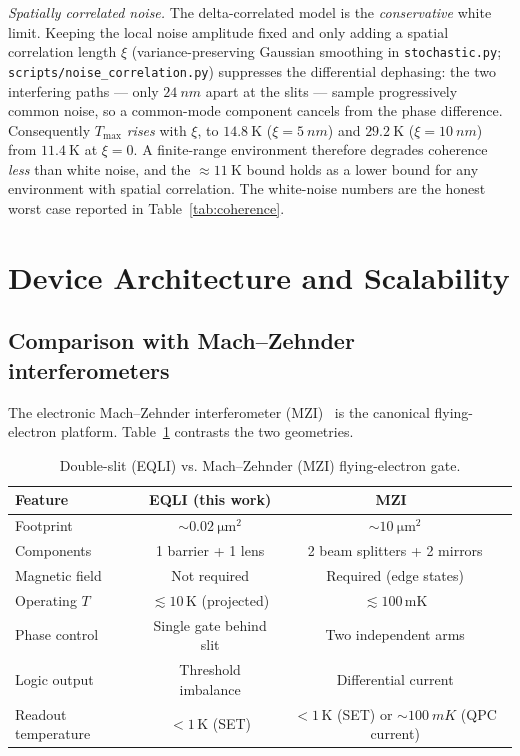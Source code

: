 \documentclass[11pt,a4paper]{article}
\begin{document}
\emph{Spatially correlated noise.} The delta-correlated model is the
\emph{conservative} white limit. Keeping the local noise amplitude fixed and
only adding a spatial correlation length $\xi$ (variance-preserving Gaussian
smoothing in \texttt{stochastic.py}; \texttt{scripts/noise\_correlation.py})
suppresses the differential dephasing: the two interfering paths $—$ only
$\SI{24}{nm}$ apart at the slits $—$ sample progressively common noise, so
a common-mode component cancels from the phase difference. Consequently
$T_{\max}$ \emph{rises} with $\xi$, to $14.8~\mathrm{K}$
($\xi=\SI{5}{nm}$) and $29.2~\mathrm{K}$ ($\xi=\SI{10}{nm}$) from
$11.4~\mathrm{K}$ at $\xi=0$. A finite-range environment therefore degrades
coherence \emph{less} than white noise, and the $\approx11~\mathrm{K}$ bound
holds as a lower bound for any environment with spatial correlation. The
white-noise numbers are the honest worst case reported in
Table~\ref{tab:coherence}.

\section{Device Architecture and Scalability}
\label{sec:device}

\subsection{Comparison with Mach--Zehnder interferometers}
\label{sec:mzi}

The electronic Mach--Zehnder interferometer (MZI)~\cite{ji2003} is the 
canonical flying-electron platform. Table~\ref{tab:comparison} contrasts the 
two geometries.

\begin{table}[t]
\centering
\caption{Double-slit (EQLI) vs. Mach--Zehnder (MZI) flying-electron gate.}
\label{tab:comparison}
\begin{tabular}{@{}lcc@{}}
\toprule
Feature & EQLI (this work) & MZI~\cite{ji2003} \\
\midrule
Footprint & $\sim\SI{0.02}{\micro\meter\squared}$ & $\sim\SI{10}{\micro\meter\squared}$ \\
Components & 1 barrier + 1 lens & 2 beam splitters + 2 mirrors \\
Magnetic field & Not required & Required (edge states) \\
Operating $T$ & $\lesssim 10\,$K (projected) & $\lesssim 100\,$mK \\
Phase control & Single gate behind slit & Two independent arms \\
Logic output & Threshold imbalance & Differential current \\
Readout temperature & $<1\,\mathrm{K}$ (SET) & $<1\,\mathrm{K}$ (SET) or $\sim\SI{100}{mK}$ (QPC current) \\
\bottomrule
\end{tabular}
\end{table}
\end{document}
